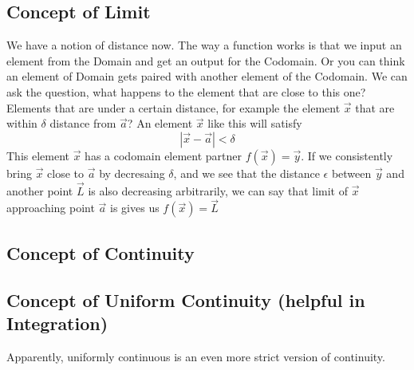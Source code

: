 \documentclass[letter]{article}
\begin{document}
\subsection*{Concept of Limit} 
\textsf{We have a notion of distance now. The way a function works is that we input an element from the Domain and get an output for the Codomain. Or you can think an element of Domain gets paired with another element of the Codomain. We can ask the question, what happens to the element that are close to this one? Elements that are under a certain distance, for example the element  $\vec{x}$ that are within $\delta$ distance from $\vec{a}$? An element $\vec{x}$ like this will satisfy 
\[
|\vec{x}- \vec{a}| < \delta
\]
This element $\vec{x}$ has a codomain element partner $f(\vec{x}) = \vec{y}$. If we consistently bring $\vec{x}$ close to $\vec{a}$ by decresaing $\delta$, and we see that the distance $\epsilon$ between $\vec{y}$ and another point $\vec{L}$ is also decreasing arbitrarily, we can say that limit of $\vec{x}$ approaching point $\vec{a}$ is gives us $f(\vec{x})= \vec{L}$
}




\subsection*{Concept of Continuity} 

\subsection*{Concept of Uniform Continuity (helpful in Integration)} 
\textsf{Apparently, uniformly continuous is an even more strict version of continuity.}
\end{document}
